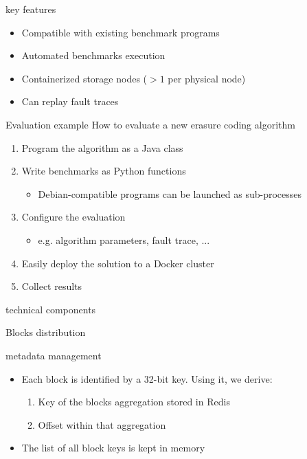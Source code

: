 \subtitle{Description}

\begin{frame}{\sys \enspace key features}
    \begin{itemize}
        \item Compatible with existing benchmark programs
        \item Automated benchmarks execution
        \item Containerized storage nodes ($>1$ per physical node)
        \item Can replay fault traces
    \end{itemize}
\end{frame}

\begin{frame}{Evaluation example}
    How to evaluate a new erasure coding algorithm
    \begin{enumerate}
        \item Program the algorithm as a Java class
        \item Write benchmarks as Python functions
        \begin{itemize}
            \item Debian-compatible programs can be launched as sub-processes
        \end{itemize}
        \item Configure the evaluation
        \begin{itemize}
            \item e.g. algorithm parameters, fault trace, ...
        \end{itemize}
        \item Easily deploy the solution to a Docker cluster
        \item Collect results
    \end{enumerate}
\end{frame}

\subtitle[Architecture]{Architecture}

\begin{frame}{\sys \enspace technical components}
    \centering
    
\end{frame}

\begin{frame}{Blocks distribution}
    \centering
    
\end{frame}

\begin{frame}{\sys\enspace metadata management}
  \begin{itemize}
  \item Each block is identified by a 32-bit key. Using it, we derive:
    \begin{enumerate}
        \item Key of the blocks aggregation stored in Redis
        \item Offset within that aggregation
    \end{enumerate}
    
    \item The list of all block keys is kept in memory

  \end{itemize}
\end{frame}

